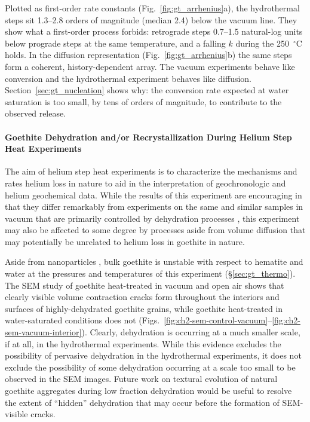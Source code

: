 Plotted as first-order rate constants (Fig.~\ref{fig:gt_arrhenius}a), the hydrothermal steps sit
1.3--2.8 orders of magnitude (median 2.4) below the vacuum line. They show what a first-order
process forbids: retrograde steps 0.7--1.5 natural-log units below prograde steps at the same
temperature, and a falling $k$ during the 250~$^\circ$C holds. In the diffusion representation
(Fig.~\ref{fig:gt_arrhenius}b) the same steps form a coherent, history-dependent array. The
vacuum experiments behave like conversion and the hydrothermal experiment behaves like
diffusion. Section~\ref{sec:gt_nucleation} shows why: the conversion rate expected at water
saturation is too small, by tens of orders of magnitude, to contribute to the observed release.


\paragraph{Goethite Dehydration and/or Recrystallization During
Helium Step Heat
Experiments}\label{goethite-dehydration-andor-recrystallization-during-hydrothermal-experiments}

The aim of helium step heat experiments is to characterize the
mechanisms and rates helium loss in nature to aid in the interpretation
of geochronologic and helium geochemical data. While the results of this
experiment are encouraging in that they differ remarkably from
experiments on the same and similar samples in vacuum that are primarily
controlled by dehydration processes \citep{farley2024}, this
experiment may also be affected to some degree by processes aside from
volume diffusion that may potentially be unrelated to helium loss in
goethite in nature.

Aside from nanoparticles \citep{guobarnard2011,navrotsky2008}, bulk goethite is unstable with respect to hematite and water at
the pressures and temperatures of this experiment \citep{majzlan2003} (\S\ref{sec:gt_thermo}). The SEM study of goethite heat-treated in vacuum and open air shows that clearly visible volume contraction cracks
form throughout the interiors and surfaces of highly-dehydrated goethite grains, while goethite heat-treated in water-saturated conditions
does not (Figs.~\ref{fig:ch2-sem-control-vacuum}--\ref{fig:ch2-sem-vacuum-interior}).
Clearly, dehydration is occurring at a much smaller scale, if at all, in the hydrothermal experiments. While this evidence excludes the possibility of pervasive dehydration in
the hydrothermal experiments, it does not exclude the possibility of some dehydration occurring at a scale too small to be observed in the SEM images. Future work
on textural evolution of natural goethite aggregates during low fraction dehydration would be useful to resolve the extent of ``hidden'' dehydration that may occur before
the formation of SEM-visible cracks.

